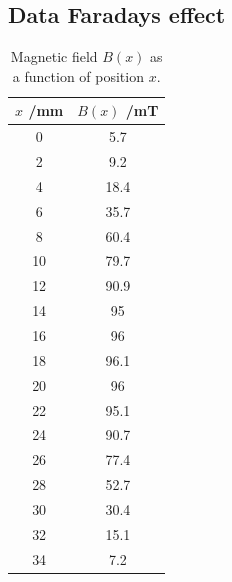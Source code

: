 \subsection*{Data Faradays effect}
\begin{table}[h]
    \centering
    \begin{tabular}{cc}
        \hline
        $x$ /mm & $B(x)$ /mT \\
        \hline
        0  & 5.7  \\
        2  & 9.2  \\
        4  & 18.4 \\
        6  & 35.7 \\
        8  & 60.4 \\
        10 & 79.7 \\
        12 & 90.9 \\
        14 & 95   \\
        16 & 96   \\
        18 & 96.1 \\
        20 & 96   \\
        22 & 95.1 \\
        24 & 90.7 \\
        26 & 77.4 \\
        28 & 52.7 \\
        30 & 30.4 \\
        32 & 15.1 \\
        34 & 7.2  \\
        \hline
    \end{tabular}
    \caption{Magnetic field $B(x)$ as a function of position $x$.}
    \label{tab:Bfield}
\end{table}